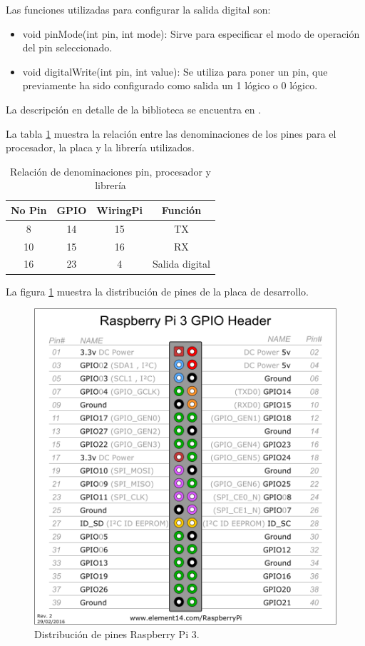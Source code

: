 Las funciones utilizadas para configurar la salida digital son:

\begin{itemize}
\item void pinMode(int pin, int mode): Sirve para especificar el modo de operación del pin seleccionado.
\item void digitalWrite(int pin, int value): Se utiliza para poner un pin, que previamente ha sido configurado como salida un 1 lógico o 0 lógico.
\end{itemize}

La descripción en detalle de la biblioteca se encuentra en \citep{WIRINGPI}.


La tabla \ref{tab:pines} muestra la relación entre las denominaciones de los pines para el procesador, la placa y la librería utilizados.

\begin{table}[h]
	\centering
	\caption[Denominación de pines]{Relación de denominaciones pin, procesador y librería}
	\begin{tabular}{c c c c}    
		\toprule
		\textbf{No Pin}  & \textbf{GPIO}  & \textbf{WiringPi} & \textbf{Función}\\
		\midrule
		8		& 14		& 15	& TX\\		
		10		& 15		& 16	& RX\\
		16		& 23		& 4		& Salida digital\\					
		\bottomrule
		\hline
	\end{tabular}
	\label{tab:pines}
\end{table}

La figura \ref{fig:gpio3}  muestra la distribución de pines de la placa de desarrollo.

\begin{figure}[H]
	\centering
	\includegraphics[scale =.3]{./Figures/gpio3.png}
	\caption{Distribución de pines Raspberry Pi 3.}
	\label{fig:gpio3}
\end{figure}

